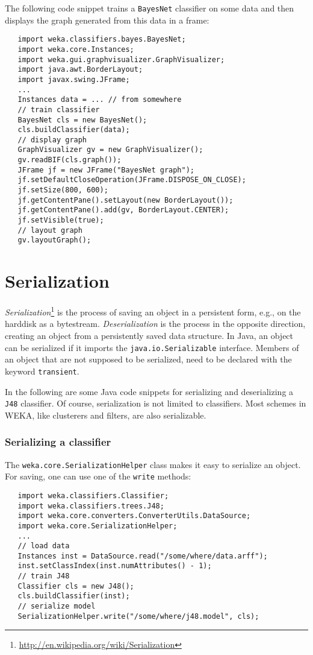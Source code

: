The following code snippet trains a \texttt{BayesNet} classifier on some data
and then displays the graph generated from this data in a frame:
\begin{verbatim}
   import weka.classifiers.bayes.BayesNet;
   import weka.core.Instances;
   import weka.gui.graphvisualizer.GraphVisualizer;
   import java.awt.BorderLayout;
   import javax.swing.JFrame;
   ...
   Instances data = ... // from somewhere
   // train classifier
   BayesNet cls = new BayesNet();
   cls.buildClassifier(data);
   // display graph
   GraphVisualizer gv = new GraphVisualizer();
   gv.readBIF(cls.graph());
   JFrame jf = new JFrame("BayesNet graph");
   jf.setDefaultCloseOperation(JFrame.DISPOSE_ON_CLOSE);
   jf.setSize(800, 600);
   jf.getContentPane().setLayout(new BorderLayout());
   jf.getContentPane().add(gv, BorderLayout.CENTER);
   jf.setVisible(true);
   // layout graph
   gv.layoutGraph();
\end{verbatim}

\newpage

\section{Serialization}
\label{api_serialization}

\textit{Serialization}\footnote{\url{http://en.wikipedia.org/wiki/Serialization}
{}} is the process of saving an object in a persistent form, e.g., on the
harddisk as a bytestream. \textit{Deserialization} is the process in the
opposite direction, creating an object from a persistently saved data structure.
In Java, an object can be serialized if it imports the
\texttt{java.io.Serializable} interface. Members of an object that are not
supposed to be serialized, need to be declared with the keyword
\texttt{transient}.

In the following are some Java code snippets for serializing and
deserializing a \texttt{J48} classifier. Of course, serialization is not limited
to classifiers. Most schemes in WEKA, like clusterers and filters, are also
serializable.

\subsubsection*{Serializing a classifier}
The \texttt{weka.core.SerializationHelper} class makes it easy to serialize an
object. For saving, one can use one of the \texttt{write} methods:
\begin{verbatim}
   import weka.classifiers.Classifier;
   import weka.classifiers.trees.J48;
   import weka.core.converters.ConverterUtils.DataSource;
   import weka.core.SerializationHelper;
   ...
   // load data
   Instances inst = DataSource.read("/some/where/data.arff");
   inst.setClassIndex(inst.numAttributes() - 1);
   // train J48
   Classifier cls = new J48();
   cls.buildClassifier(inst);
   // serialize model
   SerializationHelper.write("/some/where/j48.model", cls);
\end{verbatim}

